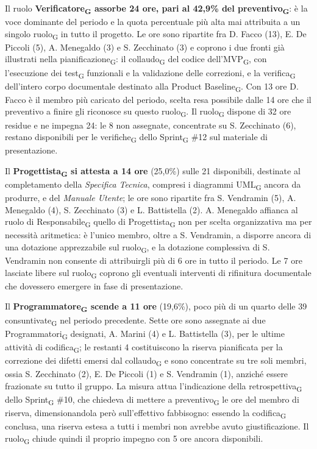 ﻿\documentclass[a4paper, 10pt, colorlinks=true, linkcolor=black, urlcolor=blue, citecolor=blue, hidelinks]{article}
\begin{document}
Il ruolo \textbf{Verificatore\textsubscript{G} assorbe 24 ore, pari al 42,9\% del preventivo\textsubscript{G}}: è la voce dominante del periodo e la quota percentuale più alta mai attribuita a un singolo ruolo\textsubscript{G} in tutto il progetto. Le ore sono ripartite fra D. Facco (13), E. De Piccoli (5), A. Menegaldo (3) e S. Zecchinato (3) e coprono i due fronti già illustrati nella pianificazione\textsubscript{G}: il collaudo\textsubscript{G} del codice dell'MVP\textsubscript{G}, con l'esecuzione dei test\textsubscript{G} funzionali e la validazione delle correzioni, e la verifica\textsubscript{G} dell'intero corpo documentale destinato alla Product Baseline\textsubscript{G}. Con 13 ore D. Facco è il membro più caricato del periodo, scelta resa possibile dalle 14 ore che il preventivo a finire gli riconosce su questo ruolo\textsubscript{G}. Il ruolo\textsubscript{G} dispone di 32 ore residue e ne impegna 24: le 8 non assegnate, concentrate su S. Zecchinato (6), restano disponibili per le verifiche\textsubscript{G} dello Sprint\textsubscript{G} \#12 sul materiale di presentazione.

Il \textbf{Progettista\textsubscript{G} si attesta a 14 ore} (25,0\%) sulle 21 disponibili, destinate al completamento della \textit{Specifica Tecnica}, compresi i diagrammi UML\textsubscript{G} ancora da produrre, e del \textit{Manuale Utente}; le ore sono ripartite fra S. Vendramin (5), A. Menegaldo (4), S. Zecchinato (3) e L. Battistella (2). A. Menegaldo affianca al ruolo di Responsabile\textsubscript{G} quello di Progettista\textsubscript{G} non per scelta organizzativa ma per necessità aritmetica: è l'unico membro, oltre a S. Vendramin, a disporre ancora di una dotazione apprezzabile sul ruolo\textsubscript{G}, e la dotazione complessiva di S. Vendramin non consente di attribuirgli più di 6 ore in tutto il periodo. Le 7 ore lasciate libere sul ruolo\textsubscript{G} coprono gli eventuali interventi di rifinitura documentale che dovessero emergere in fase di presentazione.

Il \textbf{Programmatore\textsubscript{G} scende a 11 ore} (19,6\%), poco più di un quarto delle 39 consuntivate\textsubscript{G} nel periodo precedente. Sette ore sono assegnate ai due Programmatori\textsubscript{G} designati, A. Marini (4) e L. Battistella (3), per le ultime attività di codifica\textsubscript{G}; le restanti 4 costituiscono la riserva pianificata per la correzione dei difetti emersi dal collaudo\textsubscript{G} e sono concentrate su tre soli membri, ossia S. Zecchinato (2), E. De Piccoli (1) e S. Vendramin (1), anziché essere frazionate su tutto il gruppo. La misura attua l'indicazione della retrospettiva\textsubscript{G} dello Sprint\textsubscript{G} \#10, che chiedeva di mettere a preventivo\textsubscript{G} le ore del membro di riserva, dimensionandola però sull'effettivo fabbisogno: essendo la codifica\textsubscript{G} conclusa, una riserva estesa a tutti i membri non avrebbe avuto giustificazione. Il ruolo\textsubscript{G} chiude quindi il proprio impegno con 5 ore ancora disponibili.
\end{document}
